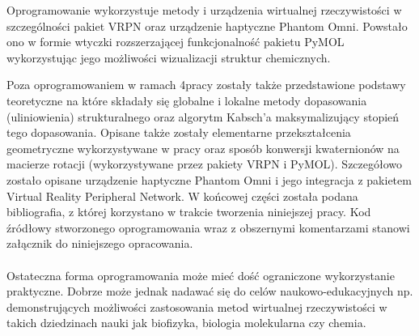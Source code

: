 \documentclass[licencjacka]{pracamgr}
\begin{document}
Oprogramowanie wykorzystuje metody i urządzenia wirtualnej rzeczywistości w szczególności pakiet VRPN oraz urządzenie haptyczne Phantom Omni. Powstało ono w formie wtyczki rozszerzającej funkcjonalność pakietu PyMOL wykorzystując jego możliwości wizualizacji struktur chemicznych.

Poza oprogramowaniem w ramach 4pracy zostały także przedstawione podstawy teoretyczne na które składały się globalne i lokalne metody dopasowania (uliniowienia) strukturalnego oraz algorytm Kabsch'a maksymalizujący stopień tego dopasowania. Opisane także zostały elementarne przekształcenia geometryczne wykorzystywane w pracy oraz sposób konwersji kwaternionów na macierze rotacji (wykorzystywane przez pakiety VRPN i PyMOL). Szczegółowo zostało opisane urządzenie haptyczne Phantom Omni i jego integracja z pakietem Virtual Reality Peripheral Network. W końcowej części została podana bibliografia, z której korzystano w trakcie tworzenia niniejszej pracy. Kod źródłowy stworzonego oprogramowania wraz z obszernymi komentarzami stanowi załącznik do niniejszego opracowania.
\\
\\
Ostateczna forma oprogramowania może mieć dość ograniczone wykorzystanie praktyczne. Dobrze może jednak nadawać się do celów naukowo-edukacyjnych np. demonstrujących możliwości zastosowania metod wirtualnej rzeczywistości w takich dziedzinach nauki jak biofizyka, biologia molekularna czy chemia.
\end{document}
